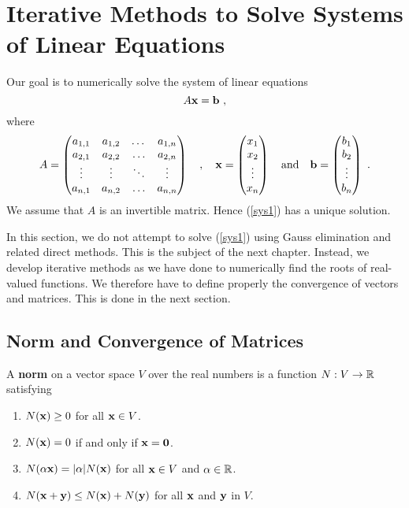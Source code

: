 \chapter{Iterative Methods to Solve Systems of Linear  Equations}
\label{chaptSeqB}

Our goal is to numerically solve the system of linear equations
\begin{equation}
A \mathbf{x} = \mathbf{b} \ , \label{sys1}
\end{equation}
where
\begin{equation} \label{matrixA}
A = \begin{pmatrix}
a_{1,1} & a_{1,2} & \dots & a_{1,n} \\
a_{2,1} & a_{2,2} & \ldots & a_{2,n} \\
\vdots & \vdots & \ddots & \vdots \\
a_{n,1} & a_{n,2} & \ldots & a_{n,n}
\end{pmatrix}
\quad, \quad
\mathbf{x} = \begin{pmatrix}
x_1 \\ x_2 \\ \vdots \\ x_n
\end{pmatrix}
\quad \text{and}\quad
\mathbf{b} = \begin{pmatrix}
b_1 \\ b_2 \\ \vdots \\ b_n
\end{pmatrix} \ .
\end{equation}
We assume that $A$ is an invertible matrix.  Hence (\ref{sys1}) has a
unique solution.

In this section, we do not attempt to solve (\ref{sys1}) using Gauss
elimination and related direct methods.  This is the subject of the
next chapter.  Instead, we develop iterative methods
as we have done to numerically find the roots of real-valued
functions.  We therefore have to define properly the convergence
of vectors and matrices.  This is done in the next section.

\section{Norm and Convergence of Matrices} \label{iter_LE_review}

\begin{defn}
A {\bfseries norm} on a vector space $V$ over the real
numbers is a function $N:V \rightarrow \mathbb{R}$ satisfying
\begin{enumerate}
\item $N(\mathbf{x}) \geq 0$ for all $\mathbf{x} \in V$.
\item $N(\mathbf{x}) = 0$ if and only if $\mathbf{x} = \mathbf{0}$.
\item $N(\alpha \mathbf{x}) = |\alpha|N(\mathbf{x})$ for all
$\mathbf{x} \in V$ and $\alpha \in \mathbb{R}$.
\item $N(\mathbf{x} + \mathbf{y}) \leq N(\mathbf{x}) + N(\mathbf{y})$ for all
$\mathbf{x}$ and $\mathbf{y}$ in $V$.
\end{enumerate}
\end{defn}

